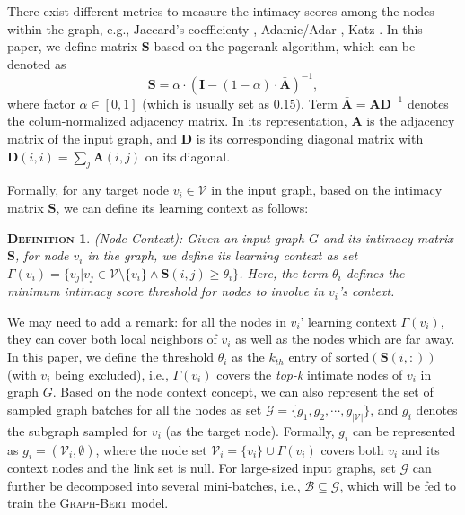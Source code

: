 \documentclass{article}
\newtheorem{definition}{\textsc{Definition}}
\newcommand{\mb}{\mathbf}
\newcommand{\mc}{\mathcal}
\newcommand{\our}{\textsc{Graph-Bert}}
\begin{document}
There exist different metrics to measure the intimacy scores among the nodes within the graph, e.g., Jaccard's coefficienty \cite{jaccard1901etude}, Adamic/Adar \cite{adamic2003friends}, Katz \cite{Katz1953}. In this paper, we define matrix $\mb{S}$ based on the pagerank algorithm, which can be denoted as
\begin{equation}
\mb{S} = \alpha \cdot \left(  \mb{I} - (1-\alpha) \cdot \bar{\mb{A}}  \right)^{-1},
\end{equation}
where factor $\alpha \in [0, 1]$ (which is usually set as $0.15$). Term $\bar{\mb{A}} = \mb{A} \mb{D}^{-1}$ denotes the colum-normalized adjacency matrix. In its representation, $\mb{A}$ is the adjacency matrix of the input graph, and $\mb{D}$ is its corresponding diagonal matrix with $\mb{D}(i,i) = \sum_j \mb{A}(i,j)$ on its diagonal. 

Formally, for any target node $v_i \in \mc{V}$ in the input graph, based on the intimacy matrix $\mb{S}$, we can define its learning context as follows:
\begin{definition}
(Node Context): Given an input graph $G$ and its intimacy matrix $\mb{S}$, for node $v_i$ in the graph, we define its learning context as set $\Gamma(v_i) = \{v_j | {v_j \in \mc{V} \setminus \{v_i\}} \land {\mb{S}(i,j) \ge \theta_i }\}$. Here, the term $\theta_i$ defines the minimum intimacy score threshold for nodes to involve in $v_i$'s context. 
\end{definition}

We may need to add a remark: for all the nodes in $v_i$' learning context $\Gamma(v_i)$, they can cover both local neighbors of $v_i$ as well as the nodes which are far away. In this paper, we define the threshold $\theta_i$ as the $k_{th}$ entry of $\mbox{sorted}(\mb{S}(i,:))$ (with $v_i$ being excluded), i.e., $\Gamma(v_i)$ covers the \textit{top-k} intimate nodes of $v_i$ in graph $G$. Based on the node context concept, we can also represent the set of sampled graph batches for all the nodes as set $\mc{G} = \{g_1, g_2, \cdots, g_{|\mc{V}|}\}$, and $g_i$ denotes the subgraph sampled for $v_i$ (as the target node). Formally, $g_i$ can be represented as $g_i = (\mc{V}_i, \emptyset)$, where the node set $\mc{V}_i = \{v_i\} \cup \Gamma(v_i)$ covers both $v_i$ and its context nodes and the link set is null. For large-sized input graphs, set $\mc{G}$ can further be decomposed into several mini-batches, i.e., $\mc{B} \subseteq \mc{G}$, which will be fed to train the {\our} model. 
\end{document}
